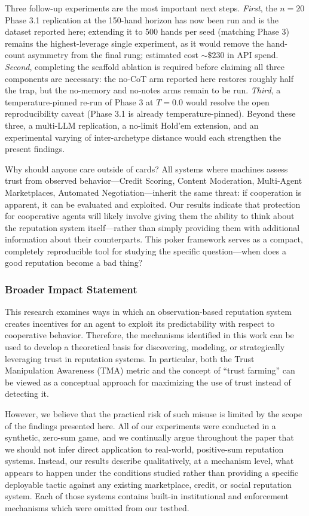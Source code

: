 \documentclass[10pt]{article} %
\begin{document}
Three follow-up experiments are the most important next steps.
\textit{First}, the $n = 20$ Phase 3.1 replication at the 150-hand horizon has now been run and is the dataset reported here; extending it to 500 hands per seed (matching Phase 3) remains the highest-leverage single experiment, as it would remove the hand-count asymmetry from the final rung; estimated cost ${\sim}\$230$ in API spend.
\textit{Second}, completing the scaffold ablation is required before claiming all three components are necessary: the no-CoT arm reported here restores roughly half the trap, but the no-memory and no-notes arms remain to be run.
\textit{Third}, a temperature-pinned re-run of Phase 3 at $T = 0.0$ would resolve the open reproducibility caveat (Phase 3.1 is already temperature-pinned).
Beyond these three, a multi-LLM replication, a no-limit Hold'em
extension, and an experimental varying of inter-archetype distance
would each strengthen the present findings.

Why should anyone care outside of cards? All systems where machines
assess trust from observed behavior---Credit Scoring, Content
Moderation, Multi-Agent Marketplaces, Automated Negotiation---inherit
the same threat: if cooperation is apparent, it can be evaluated and
exploited. Our results indicate that protection for cooperative
agents will likely involve giving them the ability to think about the
reputation system itself---rather than simply providing them with
additional information about their counterparts. This poker framework
serves as a compact, completely reproducible tool for studying the
specific question---when does a good reputation become a bad thing?

\subsubsection*{Broader Impact Statement}
This research examines ways in which an observation-based reputation system creates incentives for an agent to exploit its predictability with respect to cooperative behavior. Therefore, the mechanisms identified in this work can be used to develop a theoretical basis for discovering, modeling, or strategically leveraging trust in reputation systems. In particular, both the Trust Manipulation Awareness (TMA) metric and the concept of ``trust farming'' can be viewed as a conceptual approach for maximizing the use of trust instead of detecting it.

However, we believe that the practical risk of such misuse is limited by the scope of the findings presented here. All of our experiments were conducted in a synthetic, zero-sum game, and we continually argue throughout the paper that we should not infer direct application to real-world, positive-sum reputation systems. Instead, our results describe qualitatively, at a mechanism level, what appears to happen under the conditions studied rather than providing a specific deployable tactic against any existing marketplace, credit, or social reputation system. Each of those systems contains built-in institutional and enforcement mechanisms which were omitted from our testbed.
\end{document}
